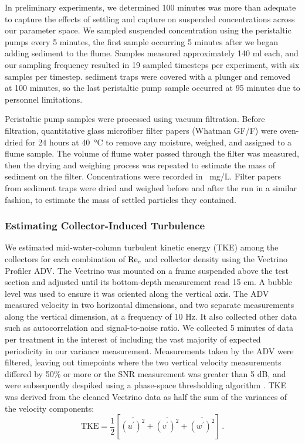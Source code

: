 \documentclass[geosciences,article,submit,moreauthors,pdftex]{Definitions/mdpi}
\begin{document}
In preliminary experiments, we determined 100 minutes was more than adequate to capture the effects of settling and capture on suspended concentrations across our parameter space. We sampled suspended concentration using the peristaltic pumps every 5 minutes, the first sample occurring 5 minutes after we began adding sediment to the flume. Samples measured approximately 140 ml each, and our sampling frequency resulted in 19 sampled timesteps per experiment, with six samples per timestep. sediment traps were covered with a plunger and removed at 100 minutes, so the last peristaltic pump sample occurred at 95 minutes due to personnel limitations.

Peristaltic pump samples were processed using vacuum filtration. Before filtration, quantitative glass microfiber filter papers (Whatman GF/F) were oven-dried for 24 hours at \SI{40}{\celsius} to remove any moisture, weighed, and assigned to a flume sample. The volume of flume water passed through the filter was measured, then the drying and weighing process was repeated to estimate the mass of sediment on the filter. Concentrations were recorded in \SI{}{\milli\gram/\liter}. Filter papers from sediment traps were dried and weighed before and after the run in a similar fashion, to estimate the mass of settled particles they contained.

\subsubsection{Estimating Collector-Induced Turbulence}

We estimated mid-water-column turbulent kinetic energy (TKE) among the collectors for each combination of $\mathrm{Re}_c$ and collector density using the Vectrino Profiler ADV. The Vectrino was mounted on a frame suspended above the test section and adjusted until its bottom-depth measurement read 15 cm. A bubble level was used to ensure it was oriented along the vertical axis. The ADV measured velocity in two horizontal dimensions, and two separate measurements along the vertical dimension, at a frequency of 10 Hz. It also collected other data such as autocorrelation and signal-to-noise ratio. We collected 5 minutes of data per treatment in the interest of including the vast majority of expected periodicity in our variance measurement. Measurements taken by the ADV were filtered, leaving out timepoints where the two vertical velocity measurements differed by 50\% or more or the SNR measurement was greater than 5 dB, and were subsequently despiked using a phase-space thresholding algorithm \cite{goring_nikora}. TKE was derived from the cleaned Vectrino data as half the sum of the variances of the velocity components:
\begin{equation}
    \text{TKE} = \frac{1}{2}[\overline{(u^\prime)^2} + \overline{(v^\prime)^2} + \overline{(w^\prime)^2}]\,.
    \label{eqn:TKE}
\end{equation}
\end{document}
